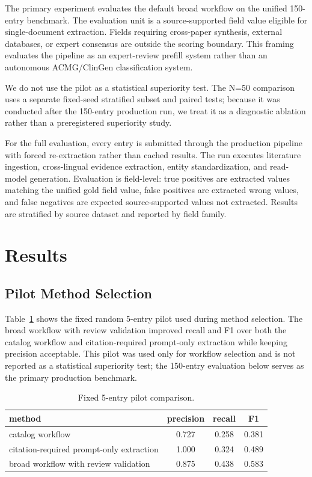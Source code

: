 \documentclass[conference]{IEEEtran}
\newcommand{\bmode}{broad}
\begin{document}
The primary experiment evaluates the default \bmode{} workflow on the unified 150-entry benchmark. The evaluation unit is a source-supported field value eligible for single-document extraction. Fields requiring cross-paper synthesis, external databases, or expert consensus are outside the scoring boundary. This framing evaluates the pipeline as an expert-review prefill system rather than an autonomous ACMG/ClinGen classification system.

We do not use the pilot as a statistical superiority test. The N=50 comparison uses a separate fixed-seed stratified subset and paired tests; because it was conducted after the 150-entry production run, we treat it as a diagnostic ablation rather than a preregistered superiority study.

For the full evaluation, every entry is submitted through the production pipeline with forced re-extraction rather than cached results. The run executes literature ingestion, cross-lingual evidence extraction, entity standardization, and read-model generation. Evaluation is field-level: true positives are extracted values matching the unified gold field value, false positives are extracted wrong values, and false negatives are expected source-supported values not extracted. Results are stratified by source dataset and reported by field family.

\section{Results}
\subsection{Pilot Method Selection}
Table~\ref{tab:pilot} shows the fixed random 5-entry pilot used during method selection. The broad workflow with review validation improved recall and F1 over both the catalog workflow and citation-required prompt-only extraction while keeping precision acceptable. This pilot was used only for workflow selection and is not reported as a statistical superiority test; the 150-entry evaluation below serves as the primary production benchmark.

\begin{table}[t]
\centering
\caption{Fixed 5-entry pilot comparison.}
\label{tab:pilot}
\setlength{\tabcolsep}{4pt}
\renewcommand{\arraystretch}{1.08}
\small
\begin{tabular}{lccc}
\toprule
method & precision & recall & F1 \\
\midrule
catalog workflow & 0.727 & 0.258 & 0.381 \\
citation-required prompt-only extraction & 1.000 & 0.324 & 0.489 \\
broad workflow with review validation & 0.875 & 0.438 & 0.583 \\
\bottomrule
\end{tabular}
\end{table}
\end{document}
